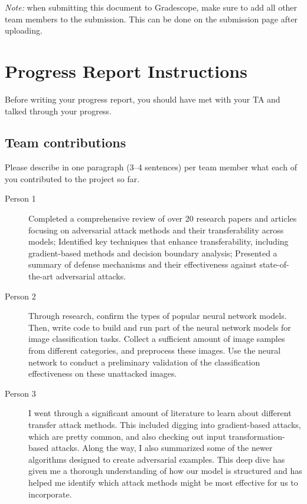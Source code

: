 \emph{Note:} when submitting this document to Gradescope, make sure to add all other team members to the submission. This can be done on the submission page after uploading.

\section*{Progress Report Instructions}

Before writing your progress report, you should have met with your TA and talked through your progress.

\subsection*{Team contributions}

Please describe in one paragraph (3--4 sentences) per team member what each of you contributed to the project so far.
\begin{description}
\item[Person 1] Completed a comprehensive review of over 20 research papers and articles focusing on adversarial attack methods and their transferability across models; Identified key techniques that enhance transferability, including gradient-based methods and decision boundary analysis; Presented a summary of defense mechanisms and their effectiveness against state-of-the-art adversarial attacks.
\item[Person 2] Through research, confirm the types of popular neural network models. Then, write code to build and run part of the neural network models for image classification tasks. Collect a sufficient amount of image samples from different categories, and preprocess these images. Use the neural network to conduct a preliminary validation of the classification effectiveness on these unattacked images.
\item[Person 3] I went through a significant amount of literature to learn about different transfer attack methods. This included digging into gradient-based attacks, which are pretty common, and also checking out input transformation-based attacks. Along the way, I also summarized some of the newer algorithms designed to create adversarial examples. This deep dive has given me a thorough understanding of how our model is structured and has helped me identify which attack methods might be most effective for us to incorporate.

\end{description}

